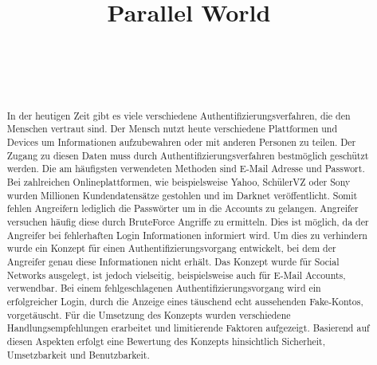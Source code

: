 \documentclass{sigchi}
\def\plaintitle{Parallel World}
\begin{document}
\title{\plaintitle}

\author{%
  \\
  \\
  \\
}

\maketitle

\begin{abstract}
In der heutigen Zeit gibt es viele verschiedene Authentifizierungsverfahren, die den Menschen vertraut sind. Der Mensch nutzt heute verschiedene Plattformen und Devices um Informationen aufzubewahren oder mit anderen Personen zu teilen. Der Zugang zu diesen Daten muss durch Authentifizierungsverfahren bestmöglich geschützt werden. Die am häufigsten verwendeten Methoden sind E-Mail Adresse und Passwort. Bei zahlreichen Onlineplattformen, wie beispielsweise Yahoo, SchülerVZ oder Sony wurden Millionen Kundendatensätze gestohlen und im Darknet veröffentlicht. Somit fehlen Angreifern lediglich die Passwörter um in die Accounts zu gelangen. Angreifer versuchen häufig diese durch BruteForce Angriffe zu ermitteln. Dies ist möglich, da der Angreifer bei fehlerhaften Login Informationen informiert wird. Um dies zu verhindern wurde ein Konzept für einen Authentifizierungsvorgang entwickelt, bei dem der Angreifer genau diese Informationen nicht erhält. Das Konzept wurde für Social Networks ausgelegt, ist jedoch vielseitig, beispielsweise auch für E-Mail Accounts, verwendbar. Bei einem fehlgeschlagenen Authentifizierungsvorgang wird ein erfolgreicher Login, durch die Anzeige eines täuschend echt aussehenden Fake-Kontos, vorgetäuscht. Für die Umsetzung des Konzepts wurden verschiedene Handlungsempfehlungen erarbeitet und limitierende Faktoren aufgezeigt. Basierend auf diesen Aspekten erfolgt eine Bewertung des Konzepts hinsichtlich Sicherheit, Umsetzbarkeit und Benutzbarkeit. 
\end{abstract}
\end{document}
